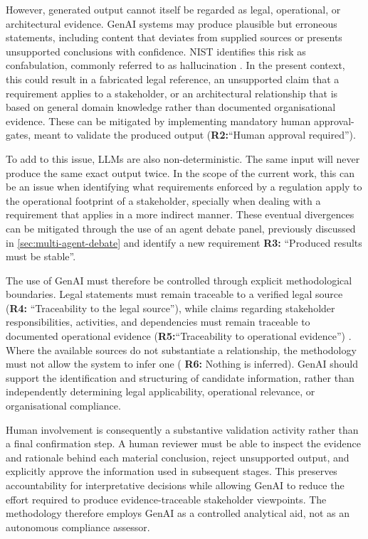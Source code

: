 However, generated output cannot itself be regarded as legal, operational, or architectural evidence. \ac{GenAI} systems may produce plausible but erroneous statements, including content that deviates from supplied sources or presents unsupported conclusions with confidence. \ac{NIST} identifies this risk as confabulation, commonly referred to as hallucination \cite{NISTGenAI2024}. In the present context, this could result in a fabricated legal reference, an unsupported claim that a requirement applies to a stakeholder, or an architectural relationship that is based on general domain knowledge rather than documented organisational evidence. These can be mitigated by implementing mandatory human approval-gates, meant to validate the produced output (\textbf{R2:}``Human approval required'').

To add to this issue, \ac{LLM}s are also non-deterministic. The same input will never produce the same exact output twice. In the scope of the current work, this can be an issue when identifying what requirements enforced by a regulation apply to the operational footprint of a stakeholder, specially when dealing with a requirement that applies in a more indirect manner. These eventual divergences can be mitigated through the use of an agent debate panel, previously discussed in \ref{sec:multi-agent-debate} and identify a new requirement \textbf{R3:} ``Produced results must be stable''.

The use of \ac{GenAI} must therefore be controlled through explicit methodological boundaries. Legal statements must remain traceable to a verified legal source (\textbf{R4:} ``Traceability to the legal source''), while claims regarding stakeholder responsibilities, activities, and dependencies must remain traceable to documented operational evidence (\textbf{R5:}``Traceability to operational evidence'') . Where the available sources do not substantiate a relationship, the methodology must not allow the system to infer one ( \textbf{R6:} Nothing is inferred). \ac{GenAI} should support the identification and structuring of candidate information, rather than independently determining legal applicability, operational relevance, or organisational compliance.

Human involvement is consequently a substantive validation activity rather than a final confirmation step. A human reviewer must be able to inspect the evidence and rationale behind each material conclusion, reject unsupported output, and explicitly approve the information used in subsequent stages. This preserves accountability for interpretative decisions while allowing \ac{GenAI} to reduce the effort required to produce evidence-traceable stakeholder viewpoints. The methodology therefore employs \ac{GenAI} as a controlled analytical aid, not as an autonomous compliance assessor.